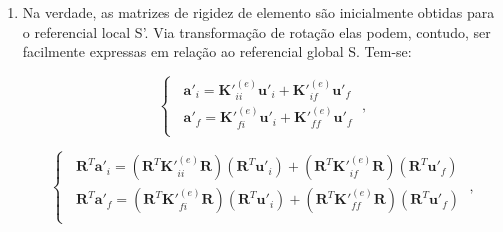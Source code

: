 \begin{enumerate}
	      A numeração de pórtico espacial é aquela indicada na Fig. \ref{el3d}. Note-se que, para treliças (planas ou espaciais) os eixos locais (de elemento) não precisam ser principais (podem ser quaisquer). Para todos os outros tipos de elemento (vigas, pórticos planos e espaciais, e grelhas), eixos locais não-centroidais e não-principais demandam formulações generalizadas de flexão para o correto estabelecimento das matrizes de rigidez.

	\item Na verdade, as matrizes de rigidez de elemento são inicialmente obtidas para o referencial local S'. Via transformação de rotação elas podem, contudo, ser facilmente expressas em relação ao referencial global S. Tem-se:

	      \medskip

	      \[
		      \left\{\;\; \begin{matrix}
			      {\mathbf{a'}}_i={\mathbf{K'}}_{ii}^{(e)}{\mathbf{u'}}_i + {\mathbf{K'}}_{if}^{(e)}{\mathbf{u'}}_f          \\
			      {\mathbf{a'}}_f={\mathbf{K'}}_{fi}^{(e)}{\mathbf{u'}}_i + {\mathbf{K'}}_{ff}^{(e)}{\mathbf{u'}}_f \\
		      \end{matrix}\right.
		      \;,
	      \]

	      \medskip

	      \[
		      \left\{\;\; \begin{matrix}
			      \mathbf{R}^{T}{\mathbf{a'}}_i=(\mathbf{R}^{T}{\mathbf{K'}}_{ii}^{(e)}\mathbf{R})(\mathbf{R}^{T}{\mathbf{u'}}_i) + (\mathbf{R}^{T}{\mathbf{K'}}_{if}^{(e)}\mathbf{R})(\mathbf{R}^{T}{\mathbf{u'}}_f) \\
			      \mathbf{R}^{T}{\mathbf{a'}}_f=(\mathbf{R}^{T}{\mathbf{K'}}_{fi}^{(e)}\mathbf{R})(\mathbf{R}^{T}{\mathbf{u'}}_i) + (\mathbf{R}^{T}{\mathbf{K'}}_{ff}^{(e)}\mathbf{R})(\mathbf{R}^{T}{\mathbf{u'}}_f) \\
		      \end{matrix}\right.
		      \;,
	      \]

	      \medskip


\end{enumerate}
